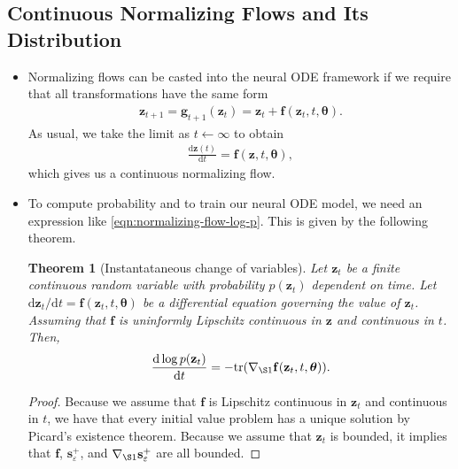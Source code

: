 \documentclass[10pt]{article}
\newtheorem{theorem}[lemma]{Theorem}
\newcommand{\dee}{\mathrm{d}}
\newcommand{\ve}[1]{\mathbf{#1}}
\newcommand{\ves}[1]{\boldsymbol{#1}}
\newcommand{\tr}{\mathrm{tr}}
\begin{document}
\subsection{Continuous Normalizing Flows and Its Distribution}
\begin{itemize}
  \item Normalizing flows can be casted into the neural ODE framework if we require that all transformations have the same form
  \begin{align*}
    \ve{z}_{t+1} = \ve{g}_{t+1}(\ve{z}_t) = \ve{z}_t + \ve{f}(\ve{z}_t, t, \ves{\theta}).
  \end{align*}
  As usual, we take the limit as $t \gets \infty$ to obtain
  \begin{align*}
    \frac{\dee \ve{z}(t)}{\dee t} = \ve{f}(\ve{z}, t, \ves{\theta}),
  \end{align*}
  which gives us a continuous normalizing flow.

  \item To compute probability and to train our neural ODE model, we need an expression like \eqref{eqn:normalizing-flow-log-p}. This is given by the following theorem.
  
  \begin{theorem}[Instantataneous change of variables]
    Let $\ve{z}_t$ be a finite continuous random variable with probability $p(\ve{z}_t)$ dependent on time. Let $\dee \ve{z}_t / \dee t = \ve{f}(\ve{z}_t, t, \ves{\theta})$ be a differential equation governing the value of $\ve{z}_t$. Assuming that $\ve{f}$ is uninformly Lipschitz continuous in $\ve{z}$ and continuous in $t$. Then,
    \begin{align*}
      \frac{\dee \log p(\ve{z}_t)}{\dee t} = -\tr(\nabla_{\S1} \ve{f}(\ve{z}_t, t, \ves{\theta})).
    \end{align*}
  \end{theorem}

  \begin{proof}
    Because we assume that $\ve{f}$ is Lipschitz continuous in $\ve{z}_t$ and continuous in $t$, we have that every initial value problem has a unique solution by Picard's existence theorem. Because we assume that $\ve{z}_t$ is bounded, it implies that $\ve{f}$, $\ve{s}^+_\varepsilon$, and $\nabla_{\S1} \ve{s}^+_\varepsilon$ are all bounded.


\end{proof}
\end{itemize}
\end{document}
